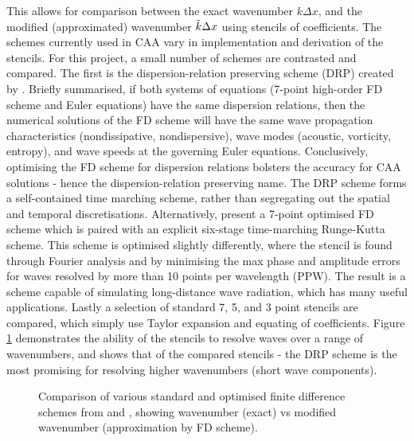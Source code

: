 This allows for comparison between the exact wavenumber $k\Delta x$, and the modified (approximated) wavenumber $\Tilde{k} \Delta x$ using stencils of coefficients. The schemes currently used in CAA vary in implementation and derivation of the stencils. For this project, a small number of schemes are contrasted and compared. The first is the dispersion-relation preserving scheme (DRP) created by \textcite{tam193DRP}. Briefly summarised, if both systems of equations (7-point high-order FD scheme and Euler equations) have the same dispersion relations, then the numerical solutions of the FD scheme will have the same wave propagation characteristics (nondissipative, nondispersive), wave modes (acoustic, vorticity, entropy), and wave speeds at the governing Euler equations. Conclusively, optimising the FD scheme for dispersion relations bolsters the accuracy for CAA solutions - hence the dispersion-relation preserving name. The DRP scheme forms a self-contained time marching scheme, rather than segregating out the spatial and temporal discretisations. Alternatively, \textcite{zingg1996HighAccFD} present a 7-point optimised FD scheme which is paired with an explicit six-stage time-marching Runge-Kutta scheme. This scheme is optimised slightly differently, where the stencil is found through Fourier analysis and by minimising the max phase and amplitude errors for waves resolved by more than 10 points per wavelength (PPW). The result is a scheme capable of simulating long-distance wave radiation, which has many useful applications. Lastly a selection of standard 7, 5, and 3 point stencils are compared, which simply use Taylor expansion and equating of coefficients. Figure \ref{fig:FD} demonstrates the ability of the stencils to resolve waves over a range of wavenumbers, and shows that of the compared stencils - the DRP \cite{tam193DRP} scheme is the most promising for resolving higher wavenumbers (short wave components).


\begin{figure}[h!]
\centering
{}
\caption{Comparison of various standard and optimised finite difference schemes from \textcite{tam193DRP} and \textcite{zingg1996HighAccFD}, showing wavenumber (exact) vs modified wavenumber (approximation by FD scheme).}
\label{fig:FD}
\end{figure}


